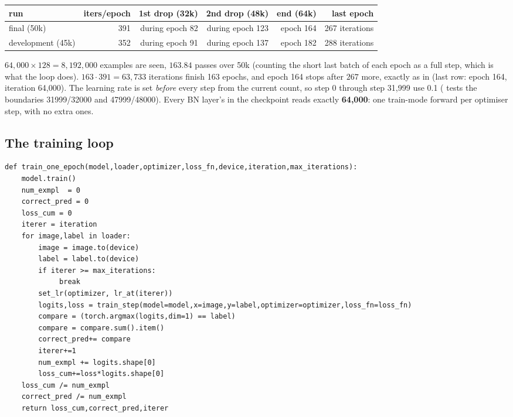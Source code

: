 \begin{repo}
\begin{center}
\small
\begin{tabular}{@{}lrrrrr@{}}
\toprule
run & iters/epoch & 1st drop (32k) & 2nd drop (48k) & end (64k) & last epoch\\
\midrule
final (50k) & 391 & during epoch 82 & during epoch 123 & epoch 164 & 267 iterations\\
development (45k) & 352 & during epoch 91 & during epoch 137 & epoch 182 & 288 iterations\\
\bottomrule
\end{tabular}
\end{center}
$64{,}000\times128 = 8{,}192{,}000$ examples are seen, $163.84$ passes over 50k (counting the short last batch of each epoch as a full step, which is what the loop does). $163\cdot391=63{,}733$ iterations finish 163 epochs, and epoch 164 stops after $267$ more, exactly as in  (last row: epoch 164, iteration 64{,}000). The learning rate is set \emph{before} every step from the current count, so step 0 through step 31{,}999 use 0.1 ( tests the boundaries 31999/32000 and 47999/48000). Every BN layer's  in the checkpoint reads exactly \textbf{64{,}000}: one train-mode forward per optimiser step, with no extra ones.
\end{repo}

\subsection{The training loop}
\label{sec:loop}

\begin{lstlisting}[firstnumber=33]
def train_one_epoch(model,loader,optimizer,loss_fn,device,iteration,max_iterations):
    model.train()
    num_exmpl  = 0
    correct_pred = 0
    loss_cum = 0
    iterer = iteration
    for image,label in loader:
        image = image.to(device)
        label = label.to(device)
        if iterer >= max_iterations:
             break
        set_lr(optimizer, lr_at(iterer))
        logits,loss = train_step(model=model,x=image,y=label,optimizer=optimizer,loss_fn=loss_fn)
        compare = (torch.argmax(logits,dim=1) == label)
        compare = compare.sum().item()
        correct_pred+= compare
        iterer+=1
        num_exmpl += logits.shape[0]
        loss_cum+=loss*logits.shape[0]
    loss_cum /= num_exmpl
    correct_pred /= num_exmpl
    return loss_cum,correct_pred,iterer
\end{lstlisting}

